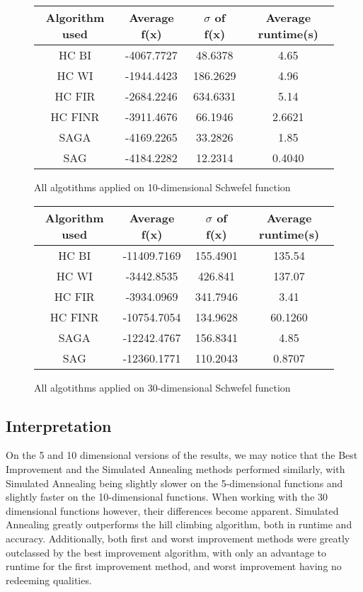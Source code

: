 \documentclass{article}
\begin{document}
\begin{figure}[H]
	\begin{tabular}{|c||c|c|c|} \hline
		Algorithm used & Average f(x) & $\sigma$ of f(x) & Average runtime(s) \\ \hline \hline
		HC BI & -4067.7727 & 48.6378 & 4.65 \\ \hline
		HC WI & -1944.4423 & 186.2629 & 4.96 \\ \hline
		HC FIR & -2684.2246 & 634.6331 & 5.14 \\ \hline
		HC FINR & -3911.4676 & 66.1946 & 2.6621 \\ \hline
		SAGA & -4169.2265 & 33.2826 & 1.85 \\ \hline
		SAG & -4184.2282 & 12.2314 & 0.4040 \\ \hline
\end{tabular}
\caption{All algotithms applied on 10-dimensional Schwefel function}
\end{figure}

\begin{figure}[H]
	\begin{tabular}{|c||c|c|c|} \hline
		Algorithm used & Average f(x) & $\sigma$ of f(x) & Average runtime(s) \\ \hline \hline
		HC BI & -11409.7169 & 155.4901 & 135.54 \\ \hline
		HC WI & -3442.8535 & 426.841 & 137.07 \\ \hline
		HC FIR & -3934.0969 & 341.7946 & 3.41 \\ \hline
		HC FINR & -10754.7054 & 134.9628 & 60.1260 \\ \hline
		SAGA & -12242.4767 & 156.8341 & 4.85 \\ \hline
		SAG & -12360.1771 & 110.2043 & 0.8707 \\ \hline
\end{tabular}
\caption{All algotithms applied on 30-dimensional Schwefel function}
\end{figure}

\subsection{Interpretation}
On the 5 and 10 dimensional versions of the results, we may notice that the Best Improvement and the Simulated Annealing methods performed similarly, with Simulated Annealing being slightly slower on the 5-dimensional functions and slightly faster on the 10-dimensional functions. When working with the 30 dimensional functions however, their differences become apparent. Simulated Annealing greatly outperforms the hill climbing algorithm, both in runtime and accuracy. Additionally, both first and worst improvement methods were greatly outclassed by the best improvement algorithm, with only an advantage to runtime for the first improvement method, and worst improvement having no redeeming qualities.
\end{document}
